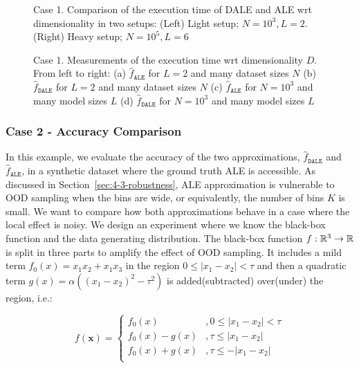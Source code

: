 \documentclass[wcp]{jmlr}
\newcommand{\dale}{\hat{f}_{\mathtt{DALE}}}
\begin{document}
\begin{figure}[h]
  \centering
  \resizebox{.4\columnwidth}{!}{}
  \resizebox{.43\columnwidth}{!}{}
  \caption[Case-1-fig-1]{Case 1. Comparison of the execution time of DALE and ALE wrt dimensionality in two setups: (Left) Light setup; \(N=10^3, L=2\).  (Right) Heavy setup; \(N=10^5, L=6\)}
  \label{fig:case-1-plots-1}
\end{figure}

\begin{figure}[h]
  \centering
  \resizebox{.23\columnwidth}{!}{}
  \resizebox{.23\columnwidth}{!}{}
  \resizebox{.23\columnwidth}{!}{}
  \resizebox{.23\columnwidth}{!}{}
  \caption[Case-1-fig-2]{
    Case 1. Measurements of the execution time wrt dimensionality \(D\). From left to right:
    (a) \(\hat{f}_{\mathtt{ALE}}\) for \(L = 2\) and many dataset sizes \(N\)
    (b) \(\dale\) for \(L = 2\) and many dataset sizes \(N\)
    (c) \(\hat{f}_{\mathtt{ALE}}\) for \(N = 10^3\) and many model sizes \(L\)
    (d) \(\dale\) for \(N = 10^3\) and many model sizes \(L\)
  }
  \label{fig:case-1-plots-2}
\end{figure}


\subsubsection{Case 2 - Accuracy Comparison}
\label{sec:example2}

In this example, we evaluate the accuracy of the two approximations, \(\dale\) and \(\hat{f}_{\mathtt{ALE}}\), in a synthetic dataset where the ground truth ALE is accessible. As discussed in Section~\ref{sec:4-3-robustness}, ALE approximation is vulnerable to OOD sampling when the bins are wide, or equivalently, the number of bins \(K\) is small. We want to compare how both approximations behave in a case where the local effect is noisy.
%
We design an experiment where we know the black-box function and the data generating distribution. The black-box function \(f:\mathbb{R}^3 \rightarrow \mathbb{R}\) is split in three parts to amplify the effect of OOD sampling. It includes a mild term \( f_0(x) = x_1x_2 + x_1x_3 \) in the region \( 0 \leq |x_1 - x_2| < \tau \) and then a quadratic term \(g(x) = \alpha ((x_1 - x_2)^2 - \tau^2)\) is added(subtracted) over(under) the region, i.e.:

\begin{equation} \label{eq:example-2-mapping} f(\mathbf{x}) =
  \begin{cases} f_0(x) & , 0 \leq |x_1 - x_2| < \tau \\ f_0(x) - g(x) & , \tau \leq |x_1 - x_2| \\ f_0(x) + g(x) & , \tau \leq - |x_1 - x_2| \\
  \end{cases}
\end{equation}
\end{document}
